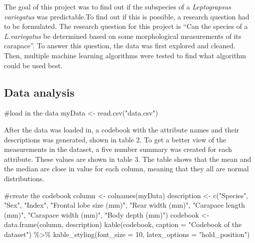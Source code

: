 \documentclass[
]{article}
\newenvironment{Shaded}{}{}
\newcommand{\AttributeTok}[1]{#1}
\newcommand{\CommentTok}[1]{\textcolor[rgb]{0.00,0.50,0.00}{#1}}
\newcommand{\DecValTok}[1]{#1}
\newcommand{\FunctionTok}[1]{#1}
\newcommand{\NormalTok}[1]{#1}
\newcommand{\OtherTok}[1]{\textcolor[rgb]{1.00,0.25,0.00}{#1}}
\newcommand{\SpecialCharTok}[1]{\textcolor[rgb]{0.00,0.50,0.50}{#1}}
\newcommand{\StringTok}[1]{\textcolor[rgb]{0.00,0.50,0.50}{#1}}
\begin{document}
The goal of this project was to find out if the subspecies of a
\emph{Leptograpsus variegatus} was predictable.To find out if this is
possible, a research question had to be formulated. The research
question for this project is ``Can the species of a \emph{L.variegatus}
be determined based on some morphological measurements of its
carapace''. To answer this question, the data was first explored and
cleaned. Then, multiple machine learning algorithms were tested to find
what algorithm could be used best.

\newpage

\hypertarget{data-analysis}{%
\subsection{Data analysis}\label{data-analysis}}

\begin{Shaded}
\begin{Highlighting}[]
\CommentTok{\#load in the data}
\NormalTok{myData }\OtherTok{\textless{}{-}} \FunctionTok{read.csv}\NormalTok{(}\StringTok{"data.csv"}\NormalTok{)}
\end{Highlighting}
\end{Shaded}

After the data was loaded in, a codebook with the attribute names and
their descriptions was generated, shown in table 2. To get a better view
of the measurements in the dataset, a five number summary was created
for each attribute. These values are shown in table 3. The table shows
that the mean and the median are close in value for each column, meaning
that they all are normal distributions.

\begin{Shaded}
\begin{Highlighting}[]
\CommentTok{\#create the codebook}
\NormalTok{column }\OtherTok{\textless{}{-}} \FunctionTok{colnames}\NormalTok{(myData)}
\NormalTok{description }\OtherTok{\textless{}{-}} \FunctionTok{c}\NormalTok{(}\StringTok{"Species"}\NormalTok{, }\StringTok{"Sex"}\NormalTok{, }\StringTok{"Index"}\NormalTok{, }\StringTok{"Frontal lobe size (mm)"}\NormalTok{, }\StringTok{"Rear width (mm)"}\NormalTok{, }\StringTok{"Carapace length (mm)"}\NormalTok{, }\StringTok{"Carapace width (mm)"}\NormalTok{, }\StringTok{"Body depth (mm)"}\NormalTok{)}
\NormalTok{codebook }\OtherTok{\textless{}{-}} \FunctionTok{data.frame}\NormalTok{(column, description)}
\FunctionTok{kable}\NormalTok{(codebook, }\AttributeTok{caption =} \StringTok{"Codebook of the dataset"}\NormalTok{) }\SpecialCharTok{\%\textgreater{}\%} 
\FunctionTok{kable\_styling}\NormalTok{(}\AttributeTok{font\_size =} \DecValTok{10}\NormalTok{, }\AttributeTok{latex\_options =} \StringTok{"hold\_position"}\NormalTok{)}
\end{Highlighting}
\end{Shaded}
\end{document}
